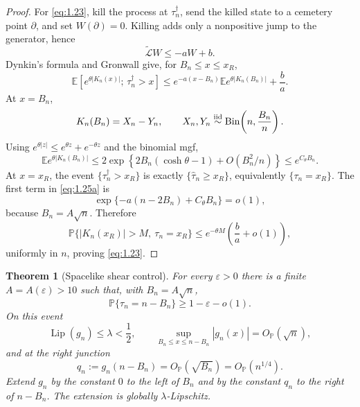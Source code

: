 \documentclass[11pt,reqno]{amsart}
\newtheorem{theorem}{Theorem}[section]
\theoremstyle{definition}
\theoremstyle{remark}
\numberwithin{equation}{section}
\newcommand{\E}{\mathbb E}
\newcommand{\Pp}{\mathbb P}
\newcommand{\Lip}{\operatorname{Lip}}
\begin{document}
\begin{proof}
For \eqref{eq:1.23}, kill the process at \(\tau_n^\dagger\), send the killed
state to a cemetery point \(\partial\), and set \(W(\partial)=0\).
Killing adds only a nonpositive jump to the generator, hence
\[
\widetilde{\mathcal L}W\le-aW+b.
\]
Dynkin's formula and Gronwall give, for \(B_n\le x\le x_R\),
\begin{equation}
\E\!\left[
e^{\theta|K_n(x)|};\,\tau_n^\dagger>x
\right]
\le
e^{-a(x-B_n)}
\E e^{\theta|K_n(B_n)|}
+\frac ba.
\label{eq:1.25a}
\end{equation}
At \(x=B_n\),
\[
K_n(B_n)=X_n-Y_n,\qquad
X_n,Y_n\stackrel{\rm iid}{\sim}
\operatorname{Bin}\!\left(n,\frac{B_n}{n}\right).
\]
Using \(e^{\theta|z|}\le e^{\theta z}+e^{-\theta z}\) and the binomial
mgf,
\begin{equation}
\E e^{\theta|K_n(B_n)|}
\le
2\exp\!\left\{
2B_n(\cosh\theta-1)+O(B_n^2/n)
\right\}
\le e^{C_\theta B_n}.
\label{eq:1.25b}
\end{equation}
At \(x=x_R\), the event \(\{\tau_n^\dagger>x_R\}\) is exactly
\(\{\widehat\tau_n\ge x_R\}\), equivalently
\(\{\tau_n=x_R\}\).  The first term in \eqref{eq:1.25a} is
\[
\exp\{-a(n-2B_n)+C_\theta B_n\}=o(1),
\]
because \(B_n=A\sqrt n\).  Therefore
\[
\Pp\{|K_n(x_R)|>M,\ \tau_n=x_R\}
\le
e^{-\theta M}\left(\frac ba+o(1)\right),
\]
uniformly in \(n\), proving \eqref{eq:1.23}.
\end{proof}

\begin{theorem}[Spacelike shear control]
\label{thm:A2}
For every \(\varepsilon>0\) there is a finite
\(A=A(\varepsilon)>10\) such that, with \(B_n=A\sqrt n\),
\begin{equation}
\Pp\{\tau_n=n-B_n\}\ge1-\varepsilon-o(1).
\label{eq:1.26}
\end{equation}
On this event
\begin{equation}
\Lip(g_n)\le\lambda<\frac12,
\qquad
\sup_{B_n\le x\le n-B_n}|g_n(x)|=O_{\Pp}(\sqrt n),
\label{eq:1.27}
\end{equation}
and at the right junction
\begin{equation}
q_n:=g_n(n-B_n)
=
O_{\Pp}(\sqrt{B_n})
=
O_{\Pp}(n^{1/4}).
\label{eq:1.28}
\end{equation}
Extend \(g_n\) by the constant \(0\) to the left of \(B_n\) and by the
constant \(q_n\) to the right of \(n-B_n\).  The extension is globally
\(\lambda\)-Lipschitz.
\end{theorem}
\end{document}
